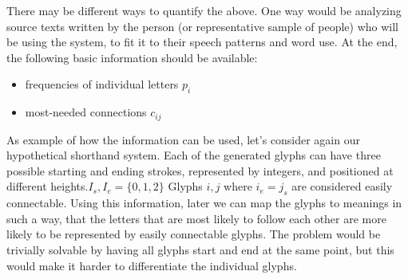 \documentclass[conference]{IEEEtran}
\begin{document}
There may be different ways to quantify the above. One way would be analyzing source texts written by the person (or representative sample of people) who will be using the system, to fit it to their speech patterns and word use. At the end, the following basic information should be available:

\begin{itemize}
        \item frequencies of individual letters \(p_i\)
        \item most-needed connections \(c_{ij}\)
\end{itemize}

As example of how the information can be used, let's consider again our hypothetical shorthand system. Each of the generated glyphs can have three possible starting and ending strokes, represented by integers, and positioned at different heights.\(I_s, I_e=\{0, 1, 2\}\) Glyphs \(i, j\) where \(i_e=j_s\) are considered easily connectable. Using this information, later we can map the glyphs to meanings in such a way, that the letters that are most likely to follow each other are more likely to be
represented by easily connectable glyphs. The problem would be trivially solvable by having all glyphs start and end at the same point, but this would make it harder to differentiate the individual glyphs.
\end{document}
